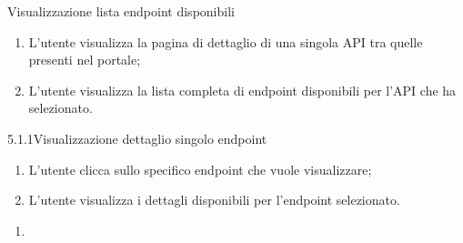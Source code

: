 \begin{usecase}{5.1}{Visualizzazione lista endpoint disponibili}\label{uc:visualizzazione-lista-endpoint-disponibili}

    \usecasemain{}
        \begin{enumerate}
            \item L'utente visualizza la pagina di dettaglio di una singola API tra quelle presenti nel portale;
            \item L'utente visualizza la lista completa di endpoint disponibili per l'API che ha selezionato.
        \end{enumerate}


\end{usecase}

%
%

\begin{usecase}{5.1.1}{Visualizzazione dettaglio singolo endpoint}\label{uc:visualizzazione-dettaglio-singolo-endpoint}

    \usecasemain{}
        \begin{enumerate}
            \item L'utente clicca sullo specifico endpoint che vuole visualizzare;
            \item L'utente visualizza i dettagli disponibili per l'endpoint selezionato.
        \end{enumerate}


\end{usecase}


\begin{usecase}{}{}\label{uc:}
    \usecasepre{}
    \usecasedesc{}
    \usecasepost{}

    \usecasemain{}
        \begin{enumerate}
            \item 
        \end{enumerate}


\end{usecase}


